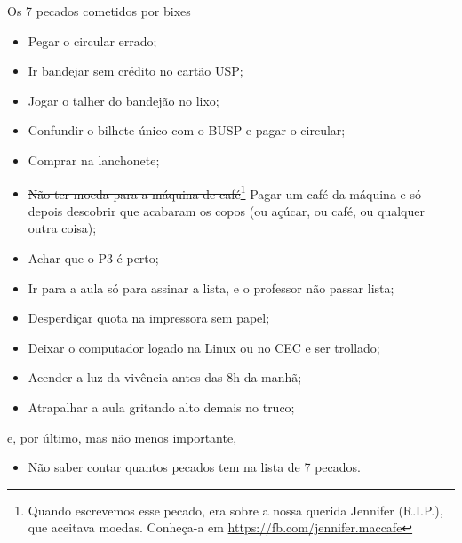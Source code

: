 \begin{editorial}{Os 7 pecados cometidos por bixes}
\begin{itemize}
  \item Pegar o circular errado;
  \item Ir bandejar sem crédito no cartão USP;
  \item Jogar o talher do bandejão no lixo;
  \item Confundir o bilhete único com o BUSP e pagar o circular;
  \item Comprar na lanchonete;
  \item \sout{Não ter moeda para a máquina de café}\footnote{Quando escrevemos
    esse pecado, era sobre a nossa querida Jennifer (R.I.P.), que aceitava
    moedas. Conheça-a em \url{https://fb.com/jennifer.maccafe}} Pagar um café da
    máquina e só depois descobrir que acabaram os copos (ou açúcar, ou café,
    ou qualquer outra coisa);
  \item Achar que o P3 é perto;
  \item Ir para a aula só para assinar a lista, e o professor não passar lista;
  \item Desperdiçar quota na impressora sem papel;
  \item Deixar o computador logado na Linux ou no CEC e ser trollado;
  \item Acender a luz da vivência antes das 8h da manhã;
  \item Atrapalhar a aula gritando alto demais no truco;
\end{itemize}
e, por último, mas não menos importante,
\begin{itemize}
  \item Não saber contar quantos pecados tem na lista de 7 pecados.
\end{itemize}

\end{editorial}
